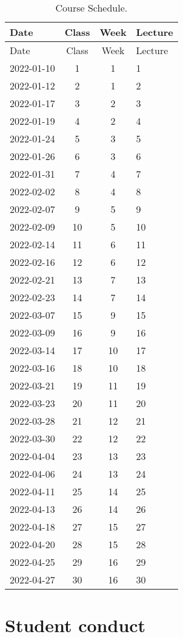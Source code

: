 \documentclass[11pt,]{article}
\begin{document}
\begin{longtable}[]{@{}lccl@{}}
\caption{Course Schedule.}\tabularnewline
\toprule
Date & Class & Week & Lecture \\
\midrule
\endfirsthead
\toprule
Date & Class & Week & Lecture \\
\midrule
\endhead
2022-01-10 & 1 & 1 & 1 \\
2022-01-12 & 2 & 1 & 2 \\
2022-01-17 & 3 & 2 & 3 \\
2022-01-19 & 4 & 2 & 4 \\
2022-01-24 & 5 & 3 & 5 \\
2022-01-26 & 6 & 3 & 6 \\
2022-01-31 & 7 & 4 & 7 \\
2022-02-02 & 8 & 4 & 8 \\
2022-02-07 & 9 & 5 & 9 \\
2022-02-09 & 10 & 5 & 10 \\
2022-02-14 & 11 & 6 & 11 \\
2022-02-16 & 12 & 6 & 12 \\
2022-02-21 & 13 & 7 & 13 \\
2022-02-23 & 14 & 7 & 14 \\
2022-03-07 & 15 & 9 & 15 \\
2022-03-09 & 16 & 9 & 16 \\
2022-03-14 & 17 & 10 & 17 \\
2022-03-16 & 18 & 10 & 18 \\
2022-03-21 & 19 & 11 & 19 \\
2022-03-23 & 20 & 11 & 20 \\
2022-03-28 & 21 & 12 & 21 \\
2022-03-30 & 22 & 12 & 22 \\
2022-04-04 & 23 & 13 & 23 \\
2022-04-06 & 24 & 13 & 24 \\
2022-04-11 & 25 & 14 & 25 \\
2022-04-13 & 26 & 14 & 26 \\
2022-04-18 & 27 & 15 & 27 \\
2022-04-20 & 28 & 15 & 28 \\
2022-04-25 & 29 & 16 & 29 \\
2022-04-27 & 30 & 16 & 30 \\
\bottomrule
\end{longtable}

\newpage

\hypertarget{student-conduct}{%
\section{Student conduct}\label{student-conduct}}
\end{document}
